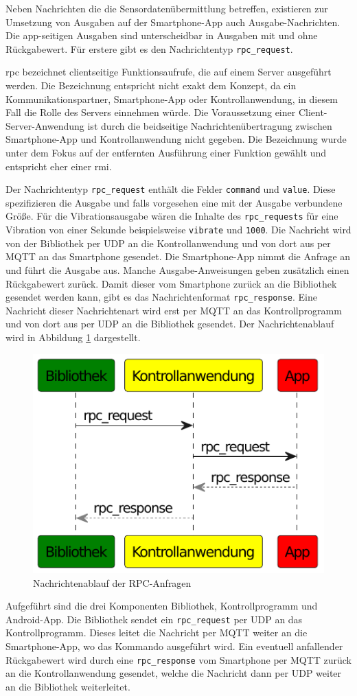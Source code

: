 \documentclass[11pt,a4paper]{report}
\begin{document}
Neben Nachrichten die die Sensordatenübermittlung betreffen, existieren zur Umsetzung von Ausgaben auf der Smartphone-App auch Ausgabe-Nachrichten.
Die app-seitigen Ausgaben sind unterscheidbar in Ausgaben mit und ohne Rückgabewert.
Für erstere gibt es den Nachrichtentyp \texttt{rpc\_request}.

\acrfull{rpc} bezeichnet clientseitige Funktionsaufrufe, die auf einem Server ausgeführt werden.
Die Bezeichnung entspricht nicht exakt dem Konzept, da ein Kommunikationspartner, Smartphone-App oder Kontrollanwendung, in diesem Fall die Rolle des Servers einnehmen würde.
Die Voraussetzung einer Client-Server-Anwendung ist durch die beidseitige Nachrichtenübertragung zwischen Smartphone-App und Kontrollanwendung nicht gegeben.
Die Bezeichnung wurde unter dem Fokus auf der entfernten Ausführung einer Funktion gewählt und entspricht eher einer \acrfull{rmi}.

Der Nachrichtentyp \texttt{rpc\_request} enthält die Felder \texttt{command} und \texttt{value}.
Diese spezifizieren die Ausgabe und falls vorgesehen eine mit der Ausgabe verbundene Größe.
Für die Vibrationsausgabe wären die Inhalte des \texttt{rpc\_requests} für eine Vibration von einer Sekunde beispielsweise \texttt{vibrate} und \texttt{1000}.
Die Nachricht wird von der Bibliothek per UDP an die Kontrollanwendung und von dort aus per MQTT an das Smartphone gesendet.
Die Smartphone-App nimmt die Anfrage an und führt die Ausgabe aus.
Manche Ausgabe-Anweisungen geben zusätzlich einen Rückgabewert zurück.
Damit dieser vom Smartphone zurück an die Bibliothek gesendet werden kann, gibt es das Nachrichtenformat \texttt{rpc\_response}.
Eine Nachricht dieser Nachrichtenart wird erst per MQTT an das Kontrollprogramm und von dort aus per UDP an die Bibliothek gesendet.
Der Nachrichtenablauf wird in Abbildung \ref{fig:message_flow_rpc} dargestellt.
\begin{figure}[htbp]
\centering
\includegraphics[width=.5\textwidth]{images/message_flow_rpc.pdf}
\caption{Nachrichtenablauf der RPC-Anfragen}
\label{fig:message_flow_rpc}
\end{figure}
Aufgeführt sind die drei Komponenten Bibliothek, Kontrollprogramm und Android-App.
Die Bibliothek sendet ein \texttt{rpc\_request} per UDP an das Kontrollprogramm.
Dieses leitet die Nachricht per MQTT weiter an die Smartphone-App, wo das Kommando ausgeführt wird.
Ein eventuell anfallender Rückgabewert wird durch eine \texttt{rpc\_response} vom Smartphone per MQTT zurück an die Kontrollanwendung gesendet, welche die Nachricht dann per UDP weiter an die Bibliothek weiterleitet.
\end{document}
